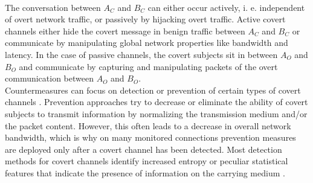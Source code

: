 \documentclass[12pt,a4paper,automark, toc=bib]{scrreprt}
\theoremstyle{definition}
\begin{document}
			\pagebreak
			\\
			The conversation between $A_C$ and $B_C$ can either occur actively, i. e. independent of overt network traffic, or passively by hijacking overt traffic. Active covert channels either hide the covert message in benign traffic between $A_C$ and $B_C$ or communicate by manipulating global network properties like bandwidth and latency. In the case of passive channels, the covert subjects sit in between $A_O$ and $B_O$ and communicate by capturing and manipulating packets of the overt communication between $A_O$ and $B_O$.  \\
			Countermeasures can focus on detection or prevention of certain types of covert channels \cite{Mazurczyk2016}. Prevention approaches try to decrease or eliminate the ability of covert subjects to transmit information by normalizing the transmission medium and/or the packet content. However, this often leads to a decrease in overall network bandwidth, which is why on many monitored connections prevention measures are deployed only after a covert channel has been detected. Most detection methods for covert channels identify increased entropy or peculiar statistical features that indicate the presence of information on the carrying medium \cite{Mazurczyk2016}.
			
\end{document}
